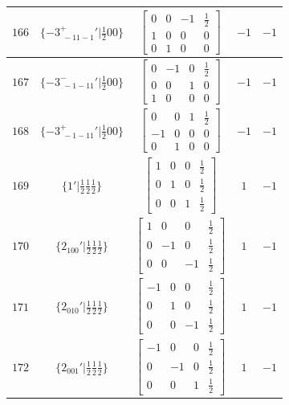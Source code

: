 \documentclass[fleqn,8pt]{jsarticle}
\begin{document}
\begin{longtable}{ccccc}
$ 166 $ & $ \{-3^{+}_{\,\,-11-1}{}'|\frac{1}{2} 0 0\} $ & $ \begin{bmatrix} 0 & 0 & -1 & \frac{1}{2} \\ 1 & 0 & 0 & 0 \\ 0 & 1 & 0 & 0 \end{bmatrix} $ & $ -1 $ & $ -1 $ \\ \hline
$ 167 $ & $ \{-3^{-}_{\,\,-1-11}{}'|\frac{1}{2} 0 0\} $ & $ \begin{bmatrix} 0 & -1 & 0 & \frac{1}{2} \\ 0 & 0 & 1 & 0 \\ 1 & 0 & 0 & 0 \end{bmatrix} $ & $ -1 $ & $ -1 $ \\ \hline
$ 168 $ & $ \{-3^{+}_{\,\,-1-11}{}'|\frac{1}{2} 0 0\} $ & $ \begin{bmatrix} 0 & 0 & 1 & \frac{1}{2} \\ -1 & 0 & 0 & 0 \\ 0 & 1 & 0 & 0 \end{bmatrix} $ & $ -1 $ & $ -1 $ \\ \hline
$ 169 $ & $ \{1{}'|\frac{1}{2} \frac{1}{2} \frac{1}{2}\} $ & $ \begin{bmatrix} 1 & 0 & 0 & \frac{1}{2} \\ 0 & 1 & 0 & \frac{1}{2} \\ 0 & 0 & 1 & \frac{1}{2} \end{bmatrix} $ & $ 1 $ & $ -1 $ \\ \hline
$ 170 $ & $ \{2{}_{100}{}'|\frac{1}{2} \frac{1}{2} \frac{1}{2}\} $ & $ \begin{bmatrix} 1 & 0 & 0 & \frac{1}{2} \\ 0 & -1 & 0 & \frac{1}{2} \\ 0 & 0 & -1 & \frac{1}{2} \end{bmatrix} $ & $ 1 $ & $ -1 $ \\ \hline
$ 171 $ & $ \{2{}_{010}{}'|\frac{1}{2} \frac{1}{2} \frac{1}{2}\} $ & $ \begin{bmatrix} -1 & 0 & 0 & \frac{1}{2} \\ 0 & 1 & 0 & \frac{1}{2} \\ 0 & 0 & -1 & \frac{1}{2} \end{bmatrix} $ & $ 1 $ & $ -1 $ \\ \hline
$ 172 $ & $ \{2{}_{001}{}'|\frac{1}{2} \frac{1}{2} \frac{1}{2}\} $ & $ \begin{bmatrix} -1 & 0 & 0 & \frac{1}{2} \\ 0 & -1 & 0 & \frac{1}{2} \\ 0 & 0 & 1 & \frac{1}{2} \end{bmatrix} $ & $ 1 $ & $ -1 $ \\ \hline

\end{longtable}
\end{document}
